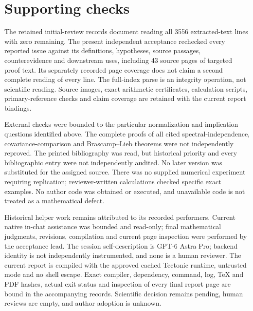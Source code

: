 \documentclass[10pt]{article}
\begin{document}
\section*{Supporting checks}
The retained initial-review records document reading all 3556 extracted-text lines with zero remaining. The present independent acceptance rechecked every reported issue against its definitions, hypotheses, source passages, counterevidence and downstream uses, including 43 source pages of targeted proof text. Its separately recorded page coverage does not claim a second complete reading of every line. The full-index parse is an integrity operation, not scientific reading. Source images, exact arithmetic certificates, calculation scripts, primary-reference checks and claim coverage are retained with the current report bindings.\par
External checks were bounded to the particular normalization and implication questions identified above. The complete proofs of all cited spectral-independence, covariance-comparison and Brascamp–Lieb theorems were not independently reproved. The printed bibliography was read, but historical priority and every bibliographic entry were not independently audited. No later version was substituted for the assigned source. There was no supplied numerical experiment requiring replication; reviewer-written calculations checked specific exact examples. No author code was obtained or executed, and unavailable code is not treated as a mathematical defect.\par
Historical helper work remains attributed to its recorded performers. Current native in-chat assistance was bounded and read-only; final mathematical judgments, revisions, compilation and current page inspection were performed by the acceptance lead. The session self-description is GPT-6 Astra Pro; backend identity is not independently instrumented, and none is a human reviewer. The current report is compiled with the approved cached Tectonic runtime, untrusted mode and no shell escape. Exact compiler, dependency, command, log, TeX and PDF hashes, actual exit status and inspection of every final report page are bound in the accompanying records. Scientific decision remains pending, human reviews are empty, and author adoption is unknown.\par
\end{document}
